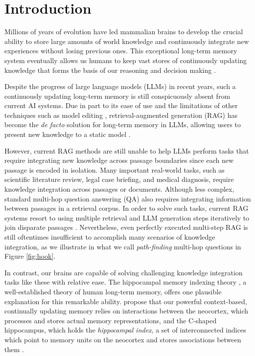 \documentclass{article}
\begin{document}
\section{Introduction}
\label{sec:introduction}

Millions of years of evolution have led mammalian brains to develop the crucial ability to store large amounts of world knowledge and continuously integrate new experiences without losing previous ones.
This exceptional long-term memory system eventually allows us humans to keep vast stores of continuously updating knowledge that forms the basis of our reasoning and decision making \cite{19Eichenbaum2000ACS}. 

Despite the progress of large language models (LLMs) in recent years, such a continuously updating long-term memory is still conspicuously absent from current AI systems.
Due in part to its ease of use and the limitations of other techniques such as model editing \cite{li2024unveiling}, retrieval-augmented generation (RAG) has become the \textit{de facto} solution for long-term memory in LLMs, allowing users to present new knowledge to a static model \cite{15Izacard2022FewshotLW,14Lewis2020RetrievalAugmentedGF,13Ram2023InContextRL, xie2024knowledgeconflict}.

However, current RAG methods are still unable to help LLMs perform tasks that require integrating new knowledge across passage boundaries since each new passage is encoded in isolation.
Many important real-world tasks, such as scientific literature review, legal case briefing, and medical diagnosis, require knowledge integration across passages or documents. Although less complex, standard multi-hop question answering (QA) also requires integrating information between passages in a retrieval corpus. In order to solve such tasks, current RAG systems resort to using multiple retrieval and LLM generation steps iteratively to join disparate passages \cite{self-ask,ircot}.
Nevertheless, even perfectly executed multi-step RAG is still oftentimes insufficient to accomplish many scenarios of knowledge integration, as we illustrate in what we call \textit{path-finding} multi-hop questions in Figure \ref{fig:hook}.

In contrast, our brains are capable of solving challenging knowledge integration tasks like these with relative ease. 
The hippocampal memory indexing theory \cite{21Teyler1986TheHM}, a well-established theory of human long-term memory, offers one plausible explanation for this remarkable ability.
\citet{21Teyler1986TheHM} propose that our powerful context-based, continually updating memory relies on interactions between the neocortex, which processes and stores actual memory representations, and the C-shaped hippocampus, which holds the \textit{hippocampal index}, a set of interconnected indices which point to memory units on the neocortex and stores associations between them \cite{19Eichenbaum2000ACS,20Teyler2007TheHI}. 
\end{document}
